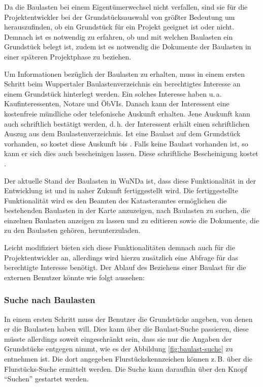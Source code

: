 Da die Baulasten bei einem Eigentümerwechsel nicht verfallen, sind sie für die Projektentwickler bei der Grundstücksauswahl von größter Bedeutung um herauszufinden, ob ein Grundstück für ein Projekt geeignet ist oder nicht.
Demnach ist es notwendig zu erfahren, ob und mit welchen Baulasten ein Grundstück belegt ist, zudem ist es notwendig die Dokumente der Baulasten in einer späteren Projektphase zu beziehen.

Um Informationen bezüglich der Baulasten zu erhalten, muss in einem ersten Schritt beim  Wuppertaler Baulastenverzeichnis ein berechtigtes Interesse an einem Grundstück hinterlegt werden.
Ein solches Interesse haben u.\,a. Kaufinteressenten, Notare und \acp{ÖbVI}.
Danach kann der Interessent eine kostenfreie mündliche oder telefonische Auskunft erhalten.
Jene Auskunft kann auch schriftlich bestätigt werden, d.\,h. der Interessent erhält einen schriftlichen Auszug  aus dem Baulastenverzeichnis.
Ist eine Baulast auf dem Grundstück vorhanden, so kostet diese Auskunft  bis .
Falls keine Baulast vorhanden ist, so kann er sich dies auch bescheinigen lassen. Diese schriftliche Bescheinigung kostet  \autocite[vgl.][]{wupp-baulast}.

Der aktuelle Stand der Baulasten in \ac{WuNDa} ist, dass diese Funktionalität in der Entwicklung ist und in naher Zukunft fertiggestellt wird.
Die fertiggestellte Funktionalität wird es den Beamten des Katasteramtes ermöglichen die bestehenden Baulasten in der Karte anzuzeigen, nach Baulasten zu suchen, die einzelnen Baulasten anzeigen zu lassen und zu editieren sowie die Dokumente, die zu den Baulasten gehören, herunterzuladen.

Leicht modifiziert bieten sich diese Funktionalitäten demnach auch für die Projektentwickler an, allerdings wird hierzu zusätzlich eine Abfrage für das berechtigte Interesse benötigt.
Der Ablauf des Beziehens einer Baulast für die externen Benutzer könnte wie folgt aussehen:
\subsubsection{Suche nach Baulasten}
In einem ersten Schritt muss der Benutzer die Grundstücke angeben, von denen er die Baulasten haben will.
Dies kann über die Baulast-Suche passieren, diese müsste allerdings soweit eingeschränkt sein, dass sie nur die Angaben der Grundstücke entgegen nimmt, wie es der Abbildung \ref{fig:baulast-suche} zu entnehmen ist.
Die dort angegeben Flurstückskennzeichen können z.\,B. über die Flurstücks-Suche ermittelt werden.
Die Suche kann daraufhin über den Knopf \enquote{Suchen} gestartet werden.

